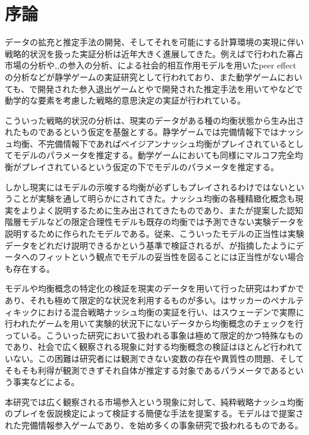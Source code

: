 
\chapter{序論}
データの拡充と推定手法の開発、そしてそれを可能にする計算環境の実現に伴い戦略的状況を扱った実証分析は近年大きく進展してきた。例えば\cite{Publishing2010}で行われた寡占市場の分析や\cite{Bresnahan1991},\cite{Tamer2003a},\cite{Seim2006}の参入の分析、\cite{Brock2001a}による社会的相互作用モデルを用いたpeer effectの分析などが静学ゲームの実証研究として行われており、また動学ゲームにおいても、\cite{Pakes1994}で開発された参入退出ゲームと\cite{Aguirregabiria2007}や\cite{Bajari2007}で開発された推定手法を用いて\cite{Exler2013}や\cite{Ryan2012}などで動学的な要素を考慮した戦略的意思決定の実証が行われている。

こういった戦略的状況の分析は、現実のデータがある種の均衡状態から生み出されたものであるという仮定を基盤とする。静学ゲームでは完備情報下ではナッシュ均衡、不完備情報下であればベイジアンナッシュ均衡がプレイされているとしてモデルのパラメータを推定する。動学ゲームにおいても同様にマルコフ完全均衡がプレイされているという仮定の下でモデルのパラメータを推定する。

しかし現実にはモデルの示唆する均衡が必ずしもプレイされるわけではないということが実験を通して明らかにされてきた。ナッシュ均衡の各種精緻化概念も現実をよりよく説明するために生み出されてきたものであり、また\cite{Economics2014}が提案した認知階層モデルなどの限定合理性モデルも既存の均衡では予測できない実験データを説明するために作られたモデルである。従来、こういったモデルの正当性は実験データをどれだけ説明できるかという基準で検証されるが、\cite{Haile2016}が指摘したようにデータへのフィットという観点でモデルの妥当性を図ることには正当性がない場合も存在する。

モデルや均衡概念の特定化の検証を現実のデータを用いて行った研究はわずかであり、それも極めて限定的な状況を利用するものが多い。\cite{Chiappori2002}はサッカーのペナルティキックにおける混合戦略ナッシュ均衡の実証を行い、\cite{Ostling2011}はスウェーデンで実際に行われたゲームを用いて実験的状況下にないデータから均衡概念のチェックを行っている。こういった研究において扱われる事象は極めて限定的かつ特殊なものであり、社会で広く観察される現象に対する均衡概念の検証はほとんど行われていない。この困難は研究者には観測できない変数の存在や異質性の問題、そしてそもそも利得が観測できずそれ自体が推定する対象であるパラメータであるという事実などによる。

本研究では広く観察される市場参入という現象に対して、純粋戦略ナッシュ均衡のプレイを仮説検定によって検証する簡便な手法を提案する。モデルは\cite{Bresnahan1991}で提案された完備情報参入ゲームであり、\cite{Ciliberto2009a}を始め多くの事象研究で扱われるものである。


